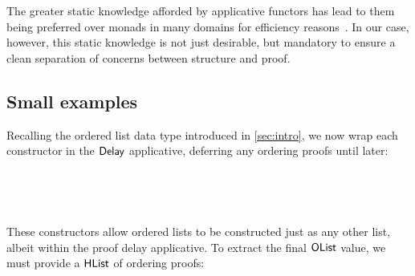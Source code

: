 \documentclass[sigplan,review]{acmart}\settopmatter{printfolios=true,printccs=false,printacmref=false}
\begin{document}
The greater static knowledge afforded by applicative functors has lead to them being preferred 
over monads in many domains for efficiency reasons~\citep{tyde16,haxl,haxl2,applicativedo}. In our case, however,
this static knowledge is not just desirable, but mandatory to ensure a clean separation of concerns 
between structure and proof.

\subsection{Small examples}
Recalling the ordered list data type introduced in \autoref{sec:intro}, we now wrap each constructor 
in the $\AgdaDatatype{Delay}$ applicative, deferring any ordering proofs until later:
\begin{code}
\>[2]\AgdaSpace{}%
\AgdaSymbol{:}\AgdaSpace{}%
\AgdaSpace{}%
\AgdaSymbol{(}\AgdaSpace{}%
\AgdaSpace{}%
\AgdaSymbol{)}\<%
\\
%
\>[2]\AgdaSpace{}%
\AgdaSymbol{=}\AgdaSpace{}%
\AgdaSpace{}%
\AgdaSpace{}%
\AgdaSpace{}%
\<%
%
\end{code}
\begin{code}
\>[2]\AgdaSpace{}%
\AgdaSymbol{:}\AgdaSpace{}%
\AgdaSymbol{(}\AgdaSpace{}%
\AgdaSymbol{:}\AgdaSpace{}%
\AgdaSymbol{)}\AgdaSpace{}%
\AgdaSpace{}%
\AgdaSpace{}%
\AgdaSymbol{(}\AgdaSpace{}%
\AgdaSpace{}%
\AgdaSymbol{)}\AgdaSpace{}%
\AgdaSpace{}%
\AgdaSpace{}%
\AgdaSymbol{(}\AgdaSpace{}%
\AgdaSpace{}%
\AgdaSymbol{)}\<%
\\
%
\>[2]\AgdaSpace{}%
\AgdaSpace{}%
\AgdaSpace{}%
\AgdaSymbol{=}\AgdaSpace{}%
\AgdaSpace{}%
\AgdaSymbol{(}\AgdaSpace{}%
\AgdaSymbol{)}\AgdaSpace{}%
\AgdaSpace{}%
\AgdaSpace{}%
\<%
\end{code}
These constructors allow ordered lists to be constructed just as any other list, albeit 
within the proof delay applicative. To extract the final $\AgdaDatatype{OList}$ value, we must 
provide a $\AgdaDatatype{HList}$ of ordering proofs:
\end{document}
